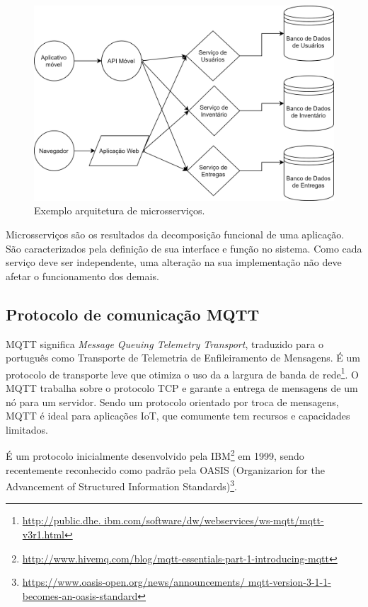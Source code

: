 \begin{figure}[htbp]
	\centering
	\includegraphics[width=1\linewidth]{figuras/microservices.png}
	\caption{Exemplo arquitetura de microsserviços.}
	\label{fig:arquitetura-microsservicos}
\end{figure}

Microsserviços são os resultados da decomposição funcional de uma aplicação. São caracterizados pela definição de sua interface e função no sistema. Como cada serviço deve ser independente, uma alteração na sua implementação não deve afetar o funcionamento dos demais. \cite{Pahl}

\subsection{Protocolo de comunicação MQTT}

MQTT significa \textit{Message Queuing Telemetry Transport}, traduzido para o português como Transporte de Telemetria de Enfileiramento de Mensagens. É um protocolo de transporte leve que otimiza o uso da a largura de banda de rede\footnote{\url{http://public.dhe. ibm.com/software/dw/webservices/ws-mqtt/mqtt-v3r1.html}}. O MQTT trabalha sobre o protocolo TCP e garante a entrega de mensagens de um nó para um servidor. Sendo um protocolo orientado por troca de mensagens, MQTT é ideal para aplicações IoT, que comumente tem recursos e capacidades limitados.

É um protocolo inicialmente desenvolvido pela IBM\footnote{\url{http://www.hivemq.com/blog/mqtt-essentials-part-1-introducing-mqtt}} em 1999, sendo recentemente reconhecido como padrão pela OASIS (Organizarion for the Advancement of Structured Information Standards)\footnote{\url{https://www.oasis-open.org/news/announcements/ mqtt-version-3-1-1-becomes-an-oasis-standard}}.

